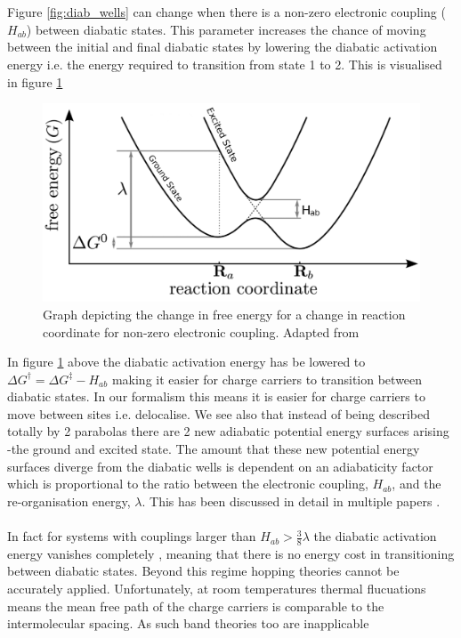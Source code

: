 \\\\
Figure \ref{fig:diab_wells} can change when there is a non-zero electronic coupling ($H_{ab}$) between diabatic states. This parameter increases the chance of moving between the initial and final diabatic states by lowering the diabatic activation energy i.e. the energy required to transition from state 1 to 2. This is visualised in figure \ref{fig:adiab_wells}
\begin{figure}[ht]
  \includegraphics[width=\textwidth]{./img/adiabatic_wells.png}
  \caption{Graph depicting the change in free energy for a change in reaction coordinate for non-zero electronic coupling. Adapted from \cite{oberhofer_charge_2017}}
  \label{fig:adiab_wells}
\end{figure}
In figure \ref{fig:adiab_wells} above the diabatic activation energy has be lowered to $\Delta G^{\dagger} = \Delta G^{\ddagger} - H_{ab}$ making it easier for charge carriers to transition between diabatic states. In our formalism this means it is easier for charge carriers to move between sites i.e. delocalise. We see also that instead of being described totally by 2 parabolas there are 2 new adiabatic potential energy surfaces arising -the ground and excited state. The amount that these new potential energy surfaces diverge from the diabatic wells is dependent on an adiabaticity factor which is proportional to the ratio between the electronic coupling, $H_{ab}$, and the re-organisation energy, $\lambda$. This has been discussed in detail in multiple papers \cite{oberhofer_charge_2017, spencer_fob-sh:_2016, spencer_confronting_2016,   Gajdos2013Mar} .
\\\\
In fact for systems with couplings larger than $H_{ab} > \frac{3}{8} \lambda$ the diabatic activation energy vanishes completely \cite{Gajdos2013Mar}, meaning that there is no energy cost in transitioning between diabatic states. Beyond this regime hopping theories cannot be accurately applied. Unfortunately, at room temperatures thermal flucuations means the mean free path of the charge carriers is comparable to the intermolecular spacing. As such band theories too are inapplicable
